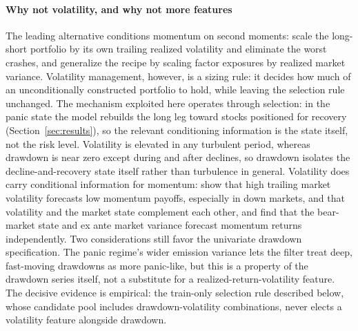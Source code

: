 \paragraph{Why not volatility, and why not more features}
The leading alternative conditions momentum on second moments: \citet{BarrosoSantaClara2015} scale the long-short portfolio by its own trailing realized volatility and eliminate the worst crashes, and \citet{MoreiraMuir2017} generalize the recipe by scaling factor exposures by realized market variance. Volatility management, however, is a sizing rule: it decides how much of an unconditionally constructed portfolio to hold, while leaving the selection rule unchanged. The mechanism exploited here operates through selection: in the panic state the model rebuilds the long leg toward stocks positioned for recovery (Section~\ref{sec:results}), so the relevant conditioning information is the state itself, not the risk level. Volatility is elevated in any turbulent period, whereas drawdown is near zero except during and after declines, so drawdown isolates the decline-and-recovery state itself rather than turbulence in general. Volatility does carry conditional information for momentum: \citet{WangXu2015} show that high trailing market volatility forecasts low momentum payoffs, especially in down markets, and that volatility and the market state complement each other, and \citet{DanielMoskowitz2016} find that the bear-market state and ex ante market variance forecast momentum returns independently. Two considerations still favor the univariate drawdown specification. The panic regime's wider emission variance lets the filter treat deep, fast-moving drawdowns as more panic-like, but this is a property of the drawdown series itself, not a substitute for a realized-return-volatility feature. The decisive evidence is empirical: the train-only selection rule described below, whose candidate pool includes drawdown-volatility combinations, never elects a volatility feature alongside drawdown.

